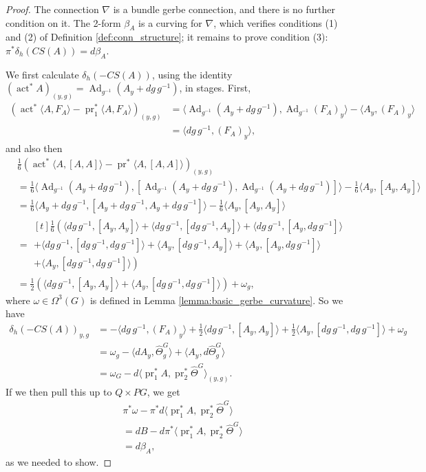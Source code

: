\documentclass[12pt]{amsart}
\DeclareMathOperator{\Ad}{Ad}
\DeclareMathOperator{\pr}{pr}
\DeclareMathOperator{\Act}{act}
\theoremstyle{plain}
\theoremstyle{definition}
\theoremstyle{remark}
\numberwithin{equation}{section}
\newcommand{\<}{\langle}
\renewcommand{\>}{\rangle}
\newcommand{\Thetahat}{\widehat{\Theta}}
\begin{document}
\begin{proof}
The connection $\nabla$ is a bundle gerbe connection, and there is no further condition on it. 
The 2-form $\beta_A$ is a curving for $\nabla$, which verifies conditions (1) and (2) of Definition \ref{def:conn_structure}; it remains to prove condition (3): $\pi^*\delta_h(CS(A)) = d\beta_A$.

We first calculate $\delta_h(-CS(A))$, using the identity $(\Act^* A)_{(y,g)} =\Ad_{g^{-1}}(A_y + dg\,g^{-1})$, in stages.
First,
\begin{align*}
\left(\Act^* \langle A,F_A \rangle - \pr_1^*\langle A,F_A \rangle\right)_{(y,g)} &= \langle \Ad_{g^{-1}}(A_y + dg\,g^{-1}), \Ad_{g^{-1}} (F_A)_y \rangle - \langle A_y,(F_A)_y \rangle\\
& = \langle dg\,g^{-1},(F_A)_y\rangle,
\end{align*}
and also then
\begin{align*}
&\tfrac16 \left(\Act^*\langle A, [A, A]\rangle -\pr^*\langle A, [A, A]\rangle\right)_{(y,g)}\\
&= \tfrac16 \langle \Ad_{g^{-1}}(A_y + dg\,g^{-1}) , [\Ad_{g^{-1}}(A_y + dg\,g^{-1}),\Ad_{g^{-1}}(A_y + dg\,g^{-1})]\rangle - \tfrac16 \langle A_y,[A_y,A_y]\rangle\\
& = \tfrac16 \langle A_y + dg\,g^{-1} , [A_y + dg\,g^{-1},A_y + dg\,g^{-1}]\rangle - \tfrac16 \langle A_y,[A_y,A_y]\rangle\\
& = \begin{multlined}[t]
\tfrac16 \left(
\langle dg\,g^{-1},[A_y,A_y]\rangle 
+ \langle dg\,g^{-1},[dg\,g^{-1},A_y]\rangle 
+ \langle dg\,g^{-1},[A_y,dg\,g^{-1}]\rangle \right.\\
+ \langle dg\,g^{-1},[dg\,g^{-1},dg\,g^{-1}]\rangle 
+ \langle A_y,[dg\,g^{-1},A_y] \rangle
+ \langle A_y,[A_y,dg\,g^{-1}] \rangle\\
\left.+ \langle A_y,[dg\,g^{-1},dg\,g^{-1}] \rangle
\right)\end{multlined}\\
& = \tfrac12 \left(\langle dg\,g^{-1},[A_y,A_y]\rangle + \langle A_y,[dg\,g^{-1},dg\,g^{-1}]\rangle\right) + \omega_g,
\end{align*}
where $\omega\in \Omega^3(G)$ is defined in Lemma \ref{lemma:basic_gerbe_curvature}. 
So we have
\begin{align*}
\delta_h(-CS(A))_{y,g} & = -\langle dg\,g^{-1},(F_A)_y\rangle
+\tfrac12 \langle dg\,g^{-1},[A_y,A_y]\rangle +\tfrac12 \langle A_y,[dg\,g^{-1},dg\,g^{-1}]\rangle + \omega_g\\
& = \omega_g -\langle dA_y,\Thetahat^G_g\rangle + \langle A_y,d\Thetahat^G_g\rangle
\\
& = \omega_G -d\langle\pr_1^*A, \pr_2^* \Thetahat^G\rangle_{(y,g)}.
\end{align*}
If we then pull this up to $Q\times PG$, we get
\begin{align*}
&\pi^*\omega - \pi^*d\langle\pr_1^*A, \pr_2^* \Thetahat^G\rangle \\
& = dB - d\pi^*\langle\pr_1^*A, \pr_2^* \Thetahat^G\rangle \\
& = d\beta_A,
\end{align*}
as we needed to show.
\end{proof}
\end{document}
